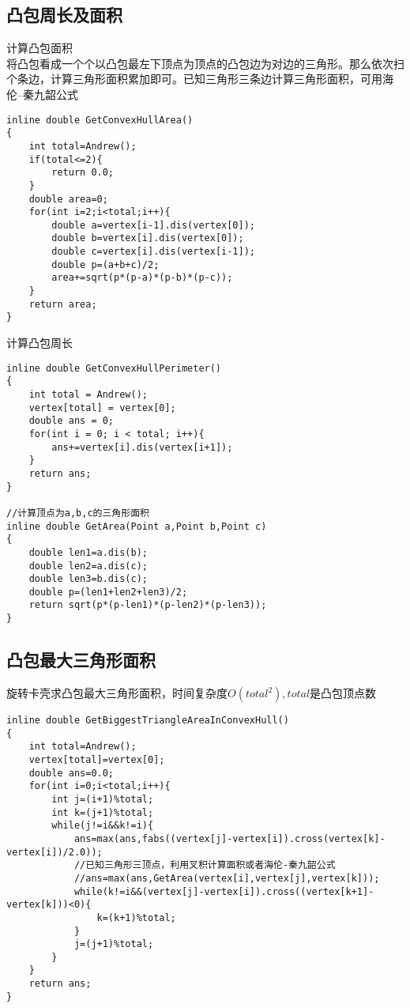 \subsection{凸包周长及面积}

计算凸包面积 \\
将凸包看成一个个以凸包最左下顶点为顶点的凸包边为对边的三角形。那么依次扫个条边，计算三角形面积累加即可。已知三角形三条边计算三角形面积，可用海伦–秦九韶公式
\begin{lstlisting}
inline double GetConvexHullArea()
{
    int total=Andrew();
    if(total<=2){
        return 0.0;
    }
    double area=0;
    for(int i=2;i<total;i++){
        double a=vertex[i-1].dis(vertex[0]);
        double b=vertex[i].dis(vertex[0]);
        double c=vertex[i].dis(vertex[i-1]);
        double p=(a+b+c)/2;
        area+=sqrt(p*(p-a)*(p-b)*(p-c));
    }
    return area;
}
\end{lstlisting}

计算凸包周长
\begin{lstlisting}
inline double GetConvexHullPerimeter()
{
    int total = Andrew();
    vertex[total] = vertex[0];
    double ans = 0;
    for(int i = 0; i < total; i++){
        ans+=vertex[i].dis(vertex[i+1]);
    }
    return ans;
}

//计算顶点为a,b,c的三角形面积
inline double GetArea(Point a,Point b,Point c)
{
    double len1=a.dis(b);
    double len2=a.dis(c);
    double len3=b.dis(c);
    double p=(len1+len2+len3)/2;
    return sqrt(p*(p-len1)*(p-len2)*(p-len3));
}
\end{lstlisting}

\subsection{凸包最大三角形面积}
旋转卡壳求凸包最大三角形面积，时间复杂度$O(total^2),total$是凸包顶点数
\begin{lstlisting}
inline double GetBiggestTriangleAreaInConvexHull()
{
    int total=Andrew();
    vertex[total]=vertex[0];
    double ans=0.0;
    for(int i=0;i<total;i++){
        int j=(i+1)%total;
        int k=(j+1)%total;
        while(j!=i&&k!=i){
            ans=max(ans,fabs((vertex[j]-vertex[i]).cross(vertex[k]-vertex[i])/2.0));
            //已知三角形三顶点，利用叉积计算面积或者海伦-秦九韶公式
            //ans=max(ans,GetArea(vertex[i],vertex[j],vertex[k]));
            while(k!=i&&(vertex[j]-vertex[i]).cross((vertex[k+1]-vertex[k]))<0){
                k=(k+1)%total;
            }
            j=(j+1)%total;
        }
    }
    return ans;
}
\end{lstlisting}

